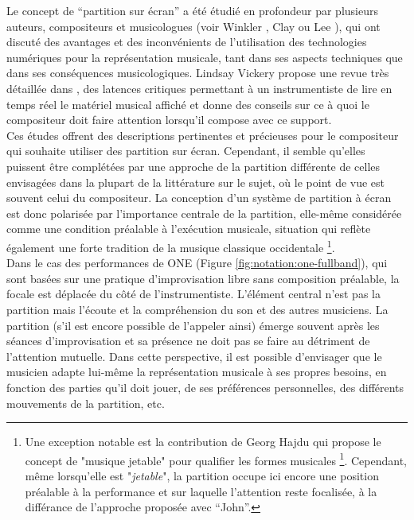 
\indent Le concept de ``partition sur écran'' a été étudié en profondeur par plusieurs auteurs, compositeurs et musicologues (voir Winkler \cite{winkler_real-time_2004}, Clay \cite{adams_inventing_2008} ou Lee \cite{lee_real-time_2012}), qui ont discuté des avantages et des inconvénients de l'utilisation des technologies numériques pour la représentation musicale, tant dans ses aspects techniques que dans ses conséquences musicologiques. Lindsay Vickery propose une revue très détaillée dans \cite{vickery_limitations_2014}, des latences critiques permettant à un instrumentiste de lire en temps réel le matériel musical affiché et donne des conseils sur ce à quoi le compositeur doit faire attention lorsqu'il compose avec ce support.\\
\indent Ces études offrent des descriptions pertinentes et précieuses pour le compositeur qui souhaite utiliser des partition sur écran. Cependant, il semble qu'elles puissent être complétées par une approche de la partition différente de celles envisagées dans la plupart de la littérature sur le sujet, où le point de vue est souvent celui du compositeur. La conception d'un système de partition à écran est donc polarisée par l'importance centrale de la partition, elle-même considérée comme une condition préalable à l'exécution musicale, situation qui reflète également une forte tradition de la musique classique occidentale \footnote{Une exception notable est la contribution de Georg Hajdu \cite{hajdu_disposable_2016} qui propose le concept de "musique jetable" pour qualifier les formes musicales \footnote{}. Cependant, même lorsqu'elle est "\textit{jetable}", la partition occupe ici encore une position préalable à la performance et sur laquelle l'attention reste focalisée, à la différance de l'approche proposée avec ``John''.}.\\
\indent Dans le cas des performances de ONE (Figure \ref{fig:notation:one-fullband}), qui sont basées sur une pratique d'improvisation libre sans composition préalable, la focale est déplacée du côté de l'instrumentiste. L'élément central n'est pas la partition mais l'écoute et la compréhension du son et des autres musiciens. La partition (s'il est encore possible de l'appeler ainsi) émerge souvent après les séances d'improvisation et sa présence ne doit pas se faire au détriment de l'attention mutuelle. Dans cette perspective, il est possible d'envisager que le musicien adapte lui-même la représentation musicale à ses propres besoins, en fonction des parties qu'il doit jouer, de ses préférences personnelles, des différents mouvements de la partition, etc.\\
